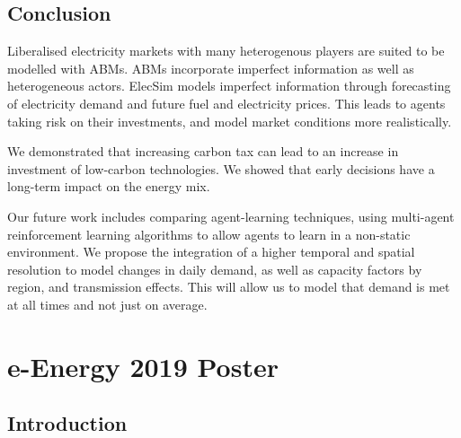 \subsection{Conclusion}



Liberalised electricity markets with many heterogenous players are suited to be modelled with ABMs. ABMs incorporate imperfect information as well as heterogeneous actors. ElecSim models imperfect information through forecasting of electricity demand and future fuel and electricity prices. This leads to agents taking risk on their investments, and model market conditions more realistically.

We demonstrated that increasing carbon tax can lead to an increase in investment of low-carbon technologies. We showed that early decisions have a long-term impact on the energy mix. 

Our future work includes comparing agent-learning techniques, using multi-agent reinforcement learning algorithms to allow agents to learn in a non-static environment. We propose the integration of a higher temporal and spatial resolution to model changes in daily demand, as well as capacity factors by region, and transmission effects. This will allow us to model that demand is met at all times and not just on average. 




\section{e-Energy 2019 Poster}

\subsection{Introduction}


